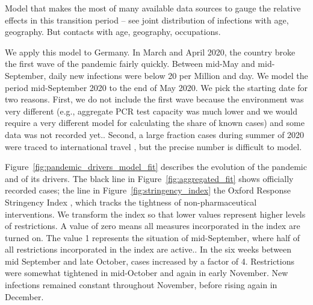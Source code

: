 Model that makes the most of many available data sources to gauge the relative effects
in this transition period -- see joint distribution of infections with age, geography.
But contacts with age, geography, occupations.

We apply this model to Germany. In March and April 2020, the country broke the first
wave of the pandemic fairly quickly. Between mid-May and mid-September, daily new
infections were below 20 per Million and day. We
model the period mid-September 2020 to the end of May 2020. We pick the starting date
for two reasons. First, we do not include the first wave because the environment was
very different (e.g., aggregate PCR test capacity was much lower and we would require a
very different model for calculating the share of known cases) and some data was not
recorded yet.. Second, a large fraction cases during summer of 2020 were traced to international
travel \citep{KochInstitut2021}, but the precise number is difficult to model.

Figure~\ref{fig:pandemic_drivers_model_fit} describes the evolution of the pandemic and
of its drivers. The black line in Figure~\ref{fig:aggregated_fit} shows officially
recorded cases; the  line in
Figure~\ref{fig:stringency_index} the Oxford Response Stringency Index \citep{Hale2020},
which tracks the tightness of non-pharmaceutical interventions. We transform the index
so that lower values represent higher levels of restrictions. A value of zero means all
measures incorporated in the index are turned on. The value 1 represents the situation
of mid-September, where half of all restrictions incorporated in the index are
active.. In the six weeks between mid September and late October, cases
increased by a factor of
4.%
Restrictions were somewhat tightened in mid-October and again in early November. New
infections remained constant throughout November, before rising again in December.

